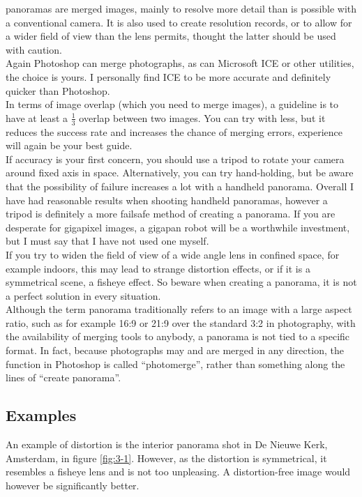 \Glspl{panorama} are merged images, mainly to resolve more detail than is possible with a conventional camera. It is also used to create resolution records, or to allow for a wider field of view than the lens permits, thought the latter should be used with caution.
\\[\baselineskip]
Again Photoshop can merge photographs, as can Microsoft ICE or other utilities, the choice is yours. I personally find ICE to be more accurate and definitely quicker than Photoshop.
\\[\baselineskip]
In terms of image overlap (which you need to merge images), a guideline is to have at least a $\frac{1}{3}$ overlap between two images. You can try with less, but it reduces the success rate and increases the chance of merging errors, experience will again be your best guide.
\\[\baselineskip]
If accuracy is your first concern, you should use a tripod to rotate your camera around fixed axis in space. Alternatively, you can try hand-holding, but be aware that the possibility of failure increases a lot with a handheld panorama. Overall I have had reasonable results when shooting handheld \glspl{panorama}, however a tripod is definitely a more failsafe method of creating a \gls{panorama}. If you are desperate for gigapixel images, a gigapan robot will be a worthwhile investment, but I must say that I have not used one myself.
\\[\baselineskip]
If you try to widen the field of view of a wide angle lens in confined space, for example indoors, this may lead to strange distortion effects, or if it is a symmetrical scene, a fisheye effect. So beware when creating a \gls{panorama}, it is not a perfect solution in every situation.
\\[\baselineskip]
Although the term \gls{panorama} traditionally refers to an image with a large aspect ratio, such as for example 16:9 or 21:9 over the standard 3:2 in photography, with the availability of merging tools to anybody, a \gls{panorama} is not tied to a specific format. In fact, because photographs may and are merged in any direction, the function in Photoshop is called ``\Gls{photomerge}'', rather than something along the lines of ``create \gls{panorama}''.

\subsection{Examples}

An example of distortion is the interior \gls{panorama} shot in De Nieuwe Kerk, Amsterdam, in figure \ref{fig:3-1}. However, as the distortion is symmetrical, it resembles a fisheye lens and is not too unpleasing. A distortion-free image would however be significantly better.

